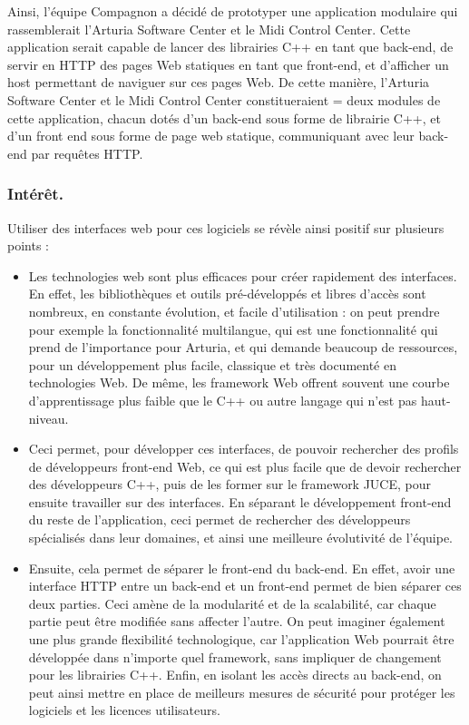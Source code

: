 \documentclass[francais]{rapportPFE}  %
\begin{document}
Ainsi, l'équipe Compagnon a décidé de prototyper une application modulaire qui rassemblerait l'Arturia Software Center et le Midi Control Center. Cette application serait capable de lancer des librairies C++ en tant que back-end, de servir en HTTP des pages Web statiques en tant que front-end, et d'afficher un host permettant de naviguer sur ces pages Web. De cette manière, l'Arturia Software Center et le Midi Control Center constitueraient = deux modules de cette application, chacun dotés d'un back-end sous forme de librairie C++, et d'un front end sous forme de page web statique, communiquant avec leur back-end par requêtes HTTP.\\

\subsubsection{Intérêt.}

Utiliser des interfaces web pour ces logiciels se révèle ainsi positif sur plusieurs points : 
\begin{itemize}
	\item Les technologies web sont plus efficaces pour créer rapidement des interfaces. En effet, les bibliothèques et outils pré-développés et libres d'accès sont nombreux, en constante évolution, et facile d'utilisation : on peut prendre pour exemple la fonctionnalité multilangue, qui est une fonctionnalité qui prend de l'importance pour Arturia, et qui demande beaucoup de ressources, pour un développement plus facile, classique et très documenté en technologies Web. De même, les framework Web offrent souvent une courbe d'apprentissage plus faible que le C++ ou autre langage qui n'est pas haut-niveau.
	\item Ceci permet, pour développer ces interfaces, de pouvoir rechercher des profils de développeurs front-end Web, ce qui est plus facile que de devoir rechercher des développeurs C++, puis de les former sur le framework JUCE, pour ensuite travailler sur des interfaces. En séparant le développement front-end du reste de l'application, ceci permet de rechercher des développeurs spécialisés dans leur domaines, et ainsi une meilleure évolutivité de l'équipe.
	\item Ensuite, cela permet de séparer le front-end du back-end. En effet, avoir une interface HTTP entre un back-end et un front-end permet de bien séparer ces deux parties. Ceci amène de la modularité et de la scalabilité, car chaque partie peut être modifiée sans affecter l'autre. On peut imaginer également une plus grande flexibilité technologique, car l'application Web pourrait être développée dans n'importe quel framework, sans impliquer de changement pour les librairies C++. Enfin, en isolant les accès directs au back-end, on peut ainsi mettre en place de meilleurs mesures de sécurité pour protéger les logiciels et les licences utilisateurs.
\end{itemize}
\end{document}
